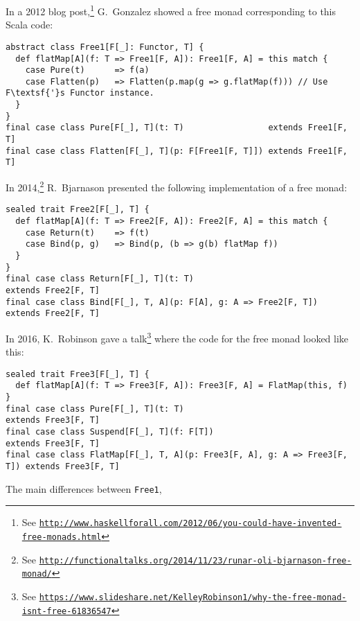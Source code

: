 In a 2012 blog post,\footnote{See \texttt{\href{http://www.haskellforall.com/2012/06/you-could-have-invented-free-monads.html}{http://www.haskellforall.com/2012/06/you-could-have-invented-free-monads.html}}}
G.~Gonzalez
showed a free monad corresponding to this Scala code:
\begin{lstlisting}
abstract class Free1[F[_]: Functor, T] {
  def flatMap[A](f: T => Free1[F, A]): Free1[F, A] = this match {
    case Pure(t)      => f(a)
    case Flatten(p)   => Flatten(p.map(g => g.flatMap(f))) // Use F\textsf{'}s Functor instance.
  }
}
final case class Pure[F[_], T](t: T)                 extends Free1[F, T]
final case class Flatten[F[_], T](p: F[Free1[F, T]]) extends Free1[F, T] 
\end{lstlisting}
In 2014,\footnote{See \texttt{\href{http://functionaltalks.org/2014/11/23/runar-oli-bjarnason-free-monad/}{http://functionaltalks.org/2014/11/23/runar-oli-bjarnason-free-monad/}}}
R.~Bjarnason presented the following
implementation of a free monad:
\begin{lstlisting}
sealed trait Free2[F[_], T] {
  def flatMap[A](f: T => Free2[F, A]): Free2[F, A] = this match {
    case Return(t)    => f(t)
    case Bind(p, g)   => Bind(p, (b => g(b) flatMap f))
  }
}
final case class Return[F[_], T](t: T)                          extends Free2[F, T]
final case class Bind[F[_], T, A](p: F[A], g: A => Free2[F, T]) extends Free2[F, T]
\end{lstlisting}
In 2016, K.~Robinson gave a talk\footnote{See \texttt{\href{https://www.slideshare.net/KelleyRobinson1/why-the-free-monad-isnt-free-61836547}{https://www.slideshare.net/KelleyRobinson1/why-the-free-monad-isnt-free-61836547}}}
where the code for the free monad looked like this:
\begin{lstlisting}
sealed trait Free3[F[_], T] {
  def flatMap[A](f: T => Free3[F, A]): Free3[F, A] = FlatMap(this, f) 
}
final case class Pure[F[_], T](t: T)                                      extends Free3[F, T]
final case class Suspend[F[_], T](f: F[T])                                extends Free3[F, T]
final case class FlatMap[F[_], T, A](p: Free3[F, A], g: A => Free3[F, T]) extends Free3[F, T]
\end{lstlisting}
The main differences between \lstinline!Free1!,
